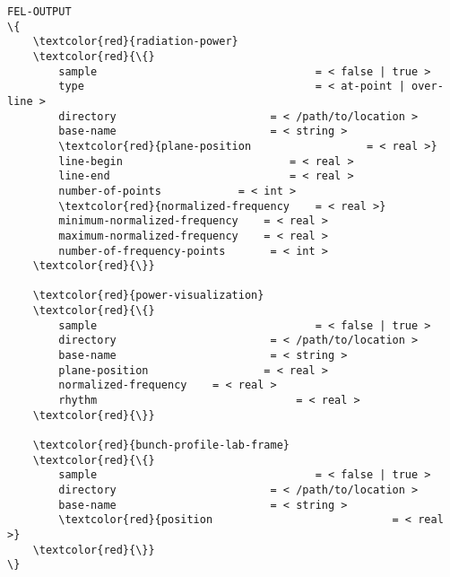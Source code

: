 \documentclass[9pt,a4paper]{article}
\begin{document}
\begin{landscape}
\begin{multicols}{3}
\begin{Verbatim}[fontsize=\footnotesize, tabsize=2, fontfamily=courier,	fontseries=b, commandchars=\\\{\}]
FEL-OUTPUT
\{
	\textcolor{red}{radiation-power}
	\textcolor{red}{\{}
		sample  								= < false | true >
		type  									= < at-point | over-line >
		directory  						 = < /path/to/location >
		base-name  						 = < string >
		\textcolor{red}{plane-position  				= < real >}
		line-begin  						= < real >
		line-end  							= < real >
		number-of-points  			= < int >
		\textcolor{red}{normalized-frequency  	= < real >}
		minimum-normalized-frequency 	= < real >
		maximum-normalized-frequency 	= < real >
		number-of-frequency-points		 = < int >
	\textcolor{red}{\}}
	
	\textcolor{red}{power-visualization}
	\textcolor{red}{\{}
		sample  								= < false | true >
		directory  						 = < /path/to/location >
		base-name  						 = < string >
		plane-position  				= < real >
		normalized-frequency  	= < real >
		rhythm		 						 = < real >
	\textcolor{red}{\}}

	\textcolor{red}{bunch-profile-lab-frame}
	\textcolor{red}{\{}
		sample  								= < false | true >
		directory  						 = < /path/to/location >
		base-name  						 = < string >
		\textcolor{red}{position		  					= < real >}
	\textcolor{red}{\}}
\}
\end{Verbatim}
\end{multicols}
\end{landscape}
\end{document}
